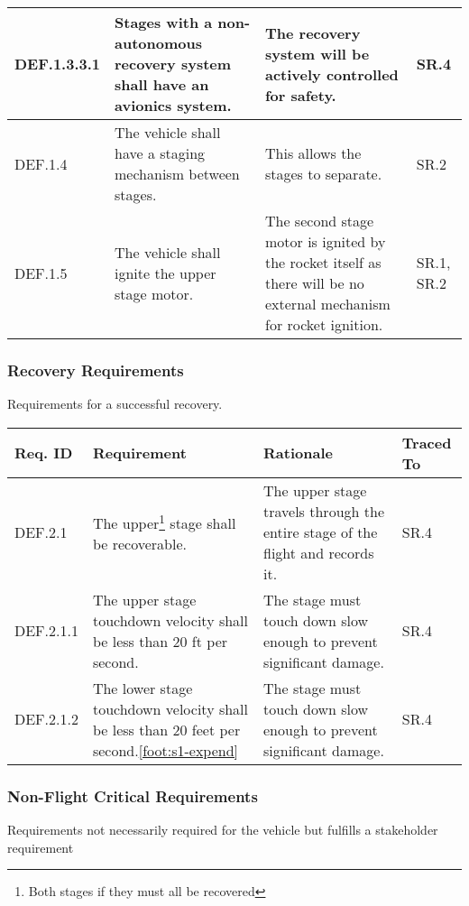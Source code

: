 \begin{table}[htbp]
\begin{tabulary}{\textwidth}{@{}LLLL@{}}
        DEF.1.3.3.1 & Stages with a non-autonomous recovery system shall have an avionics system. & The recovery system will be actively controlled for safety. & SR.4 \\
    \midrule
        DEF.1.4 & The vehicle shall have a staging mechanism between stages. & This allows the stages to separate. & SR.2 \\
    \midrule
        DEF.1.5 & The vehicle shall ignite the upper stage motor. & The second stage motor is ignited by the rocket itself as there will be no external mechanism for rocket ignition. & SR.1, SR.2 \\
    \bottomrule
    \end{tabulary}

    \label{table:func-1}
\end{table}


\subsubsection{Recovery Requirements}
Requirements for a successful recovery.

\begin{table}[htbp] %
    \footnotesize 
    \setlength{\tymin}{40pt}
    \let\raggedright\RaggedRight
    
    \begin{tabulary}{\textwidth}{@{}LLLL@{}}
    \toprule
        \textbf{Req. ID} & \textbf{Requirement} & \textbf{Rationale} & \textbf{Traced To} \\
    \midrule
        DEF.2.1 & The upper\footnote{\label{foot:def21} Both stages if they must all be recovered} stage shall be recoverable. & The upper stage travels through the entire stage of the flight and records it. & SR.4 \\
        DEF.2.1.1 & The upper stage touchdown velocity shall be less than 20 ft per second. & The stage must touch down slow enough to prevent significant damage. & SR.4 \\ 
        DEF.2.1.2 & The lower stage touchdown velocity shall be less than 20 feet per second.\cref{foot:s1-expend} & The stage must touch down slow enough to prevent significant damage. & SR.4 \\
    \bottomrule
    \end{tabulary}

    \label{table:func-2}
\end{table}


\subsubsection{Non-Flight Critical Requirements}
Requirements not necessarily required for the vehicle but fulfills a stakeholder requirement	

